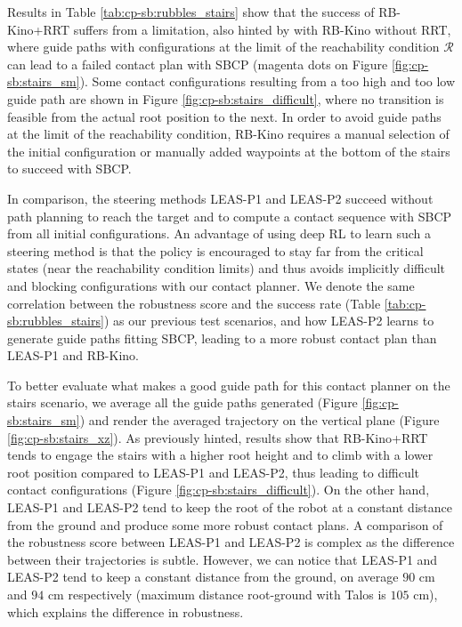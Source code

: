 Results in Table \ref{tab:cp-sb:rubbles_stairs} show that the success of RB-Kino+RRT suffers from a limitation, also hinted by with RB-Kino without RRT, where guide paths with configurations at the limit of the reachability condition $\mathcal{R}$ can lead to a failed contact plan with SBCP (magenta dots on Figure \ref{fig:cp-sb:stairs_sm}).
Some contact configurations resulting from a too high and too low guide path are shown in Figure \ref{fig:cp-sb:stairs_difficult}, where no transition is feasible from the actual root position to the next.
In order to avoid guide paths at the limit of the reachability condition, RB-Kino requires a manual selection of the initial configuration or manually added waypoints at the bottom of the stairs to succeed with SBCP.



In comparison, the steering methods LEAS-P1 and LEAS-P2 succeed without path planning to reach the target and to compute a contact sequence with SBCP from all initial configurations.
An advantage of using deep RL to learn such a steering method is that the policy is encouraged to stay far from the critical states (near the reachability condition limits) and thus avoids implicitly difficult and blocking configurations with our contact planner.
We denote the same correlation between the robustness score and the success rate (Table \ref{tab:cp-sb:rubbles_stairs}) as our previous test scenarios, and how LEAS-P2 learns to generate guide paths fitting SBCP, leading to a more robust contact plan than LEAS-P1 and RB-Kino.

To better evaluate what makes a good guide path for this contact planner on the stairs scenario, we average all the guide paths generated (Figure \ref{fig:cp-sb:stairs_sm}) and render the averaged trajectory on the vertical plane (Figure \ref{fig:cp-sb:stairs_xz}).
As previously hinted, results show that RB-Kino+RRT tends to engage the stairs with a higher root height and to climb with a lower root position compared to LEAS-P1 and LEAS-P2, thus leading to difficult contact configurations (Figure \ref{fig:cp-sb:stairs_difficult}).
On the other hand, LEAS-P1 and LEAS-P2 tend to keep the root of the robot at a constant distance from the ground and produce some more robust contact plans.
A comparison of the robustness score between LEAS-P1 and LEAS-P2 is complex as the difference between their trajectories is subtle. 
However, we can notice that LEAS-P1 and LEAS-P2 tend to keep a constant distance from the ground, on average $90$ cm and $94$ cm respectively (maximum distance root-ground with Talos is $105$ cm), which explains the difference in robustness.


